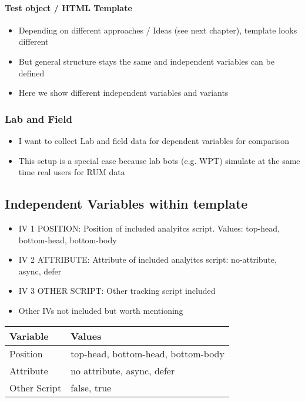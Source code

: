 \paragraph{Test object / HTML Template}

\begin{itemize}
\item Depending on different approaches / Ideas (see next chapter), template looks different
\item But general structure stays the same and independent variables can be defined
\item Here we show different independent variables and variants
\end{itemize}


\subsubsection{Lab and Field}

\begin{itemize}
\item I want to collect Lab and field data for dependent variables for comparison
\item This setup is a special case because lab bots (e.g. WPT) simulate at the same time real users for RUM data
\end{itemize}






\subsection{Independent Variables within template}


\begin{itemize}
\item IV 1 POSITION: Position of included analyitcs script. Values: top-head, bottom-head, bottom-body
\item IV 2 ATTRIBUTE: Attribute of included analyitcs script: no-attribute, async, defer
\item IV 3 OTHER SCRIPT: Other tracking script included
\item Other IVs not included but worth mentioning
\end{itemize}




\begin{table}[]
	\centering
	\begin{tabular}{| l | l | }
	\hline
	Variable & Values \\
	\hline
	Position & top-head, bottom-head, bottom-body \\
	Attribute & no attribute, async, defer \\
	Other Script & false, true \\
	\hline
	\end{tabular}
\end{table}

